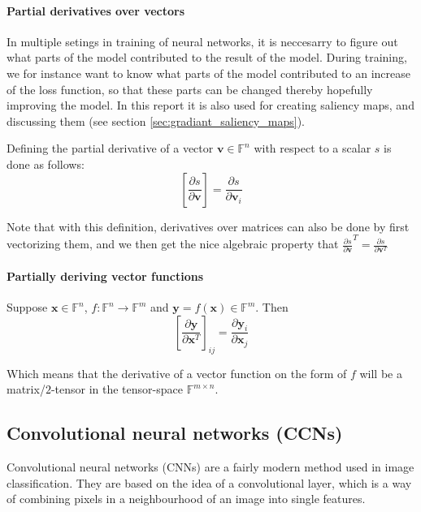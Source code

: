 \documentclass[11pt,a4paper]{article}
\newcommand{\bm}[1]{\textbf{#1}}
\newcommand{\vecsym}[1]{\bm{#1}}
\begin{document}
\paragraph{Partial derivatives over vectors} \label{sec:partial_derivatives_of_scalar_over_vector}
In multiple setings in training of neural networks, it is neccesarry to figure out what
parts of the model contributed to the result of the model.
During training, we for instance want to know what parts of the model contributed to an increase of the loss function,
so that these parts can be changed thereby hopefully improving the model.
In this report it is also used for creating saliency maps, and discussing them (see section \ref{sec:gradiant_saliency_maps}).

Defining the partial derivative of a vector $\vecsym{v}\in\mathbb{F}^n$ with respect to a scalar $s$ is done as follows:
\begin{equation}
    \left[ \frac{\partial s}{\partial \vecsym{v}} \right] = \frac{\partial s}{\partial \vecsym{v}_i}
\end{equation}

Note that with this definition, derivatives over matrices can also be done by first vectorizing them,
and we then get the nice algebraic property that  $\frac{\partial s}{\partial \vecsym{v}}^{T} = \frac{\partial s}{\partial \vecsym{v}^{T}}$ 


\paragraph{Partially deriving vector functions}
Suppose $\vecsym{x} \in \mathbb{F}^n$, 
$f: \mathbb{F}^n \rightarrow \mathbb{F}^m$ and
$\vecsym{y} = f(\vecsym{x}) \in \mathbb{F}^m$.
Then
\begin{equation}
    \left[ \frac{\partial \vecsym{y}}{\partial \vecsym{x}^T} \right]_{ij} =
    \frac{\partial \vecsym{y}_i}{\partial \vecsym{x}_j}
\end{equation}

Which means that the derivative of a vector function on the form of $f$ will be a matrix/$2$-tensor
in the tensor-space $\mathbb{F}^{m\times n}$.


\subsection{Convolutional neural networks (CCNs)}
Convolutional neural networks (CNNs) are a fairly modern method used in image classification.
They are based on the idea of a convolutional layer, which is a way of combining pixels in a
neighbourhood of an image into single features.
\end{document}
